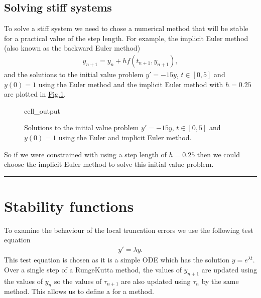 \documentclass[letterpaper,10pt,english]{jupyterBook}
\begin{document}
\subsection{Solving stiff systems}
\label{\detokenize{4_Stability/4.0_Stability:solving-stiff-systems}}
\sphinxAtStartPar
To solve a stiff system we need to chose a numerical method that will be stable for a practical value of the step length. For example, the implicit Euler method (also known as the backward Euler method)
\begin{align*}
    y_{n+1} = y_n + h f(t_{n+1}, y_{n+1}),
\end{align*}
\sphinxAtStartPar
and the solutions to the initial value problem \(y' = -15y\), \(t\in [0, 5]\) and \(y(0) = 1\) using the Euler method and the implicit Euler method with \(h=0.25\) are plotted in \hyperref[\detokenize{4_Stability/4.0_Stability:stiff-solution-2}]{Fig.\@ \ref{\detokenize{4_Stability/4.0_Stability:stiff-solution-2}}}.

\begin{figure}[htbp]
\centering
\capstart
\begin{sphinxVerbatimOutput}

\begin{sphinxuseclass}{cell_output}
\noindent{}

\end{sphinxuseclass}\end{sphinxVerbatimOutput}
\caption{Solutions to the initial value problem \(y' = -15y\), \(t\in [0, 5]\) and \(y(0) = 1\) using the Euler and implicit Euler method.}\label{\detokenize{4_Stability/4.0_Stability:stiff-solution-2}}\end{figure}

\sphinxAtStartPar
So if we were constrained with using a step length of \(h=0.25\) then we could choose the implicit Euler method to solve this initial value problem.


\bigskip\hrule\bigskip


\sphinxstepscope


\section{Stability functions}
\label{\detokenize{4_Stability/4.1_Stability_functions:stability-functions}}\label{\detokenize{4_Stability/4.1_Stability_functions:stability-functions-section}}\label{\detokenize{4_Stability/4.1_Stability_functions::doc}}
\sphinxAtStartPar
To examine the behaviour of the local truncation errors we use the following test equation
\begin{equation}\label{equation:4_Stability/4.1_Stability_functions:test-equation}
\begin{split}y' = \lambda y.\end{split}
\end{equation}
\sphinxAtStartPar
This test equation is chosen as it is a simple ODE which has the solution \(y=e^{\lambda t}\). Over a single step of a Runge\sphinxhyphen{}Kutta method, the values of \(y_{n+1}\) are updated using the values of \(y_n\) so the values of \(\tau_{n+1}\) are also updated using \(\tau_n\) by the same method. This allows us to define a  for a method.
\end{document}
